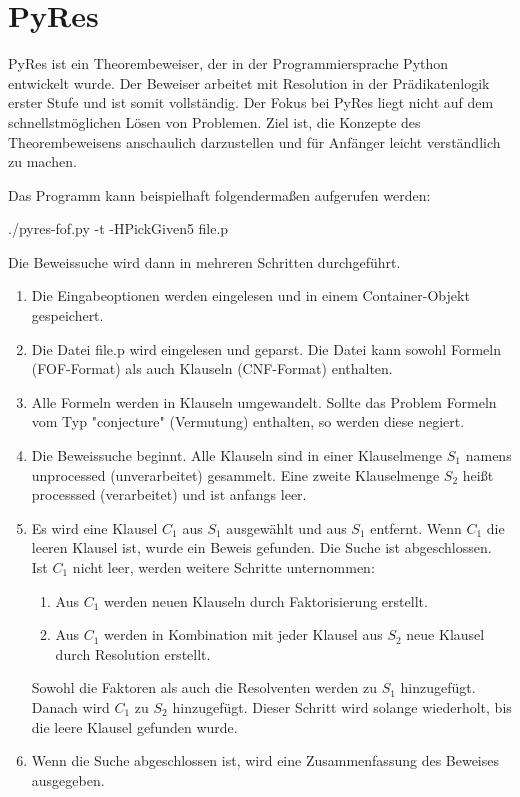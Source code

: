 	\section{PyRes}
PyRes ist ein Theorembeweiser, der in der Programmiersprache Python entwickelt wurde. Der Beweiser arbeitet mit Resolution in der Prädikatenlogik erster Stufe und ist somit vollständig. Der Fokus bei PyRes liegt nicht auf dem schnellstmöglichen Lösen von Problemen. Ziel ist, die Konzepte des Theorembeweisens anschaulich darzustellen und für Anfänger leicht verständlich zu machen. \cite{Schulz2020PyRes}

Das Programm kann beispielhaft folgendermaßen aufgerufen werden:

./pyres-fof.py -t -HPickGiven5 file.p

Die Beweissuche wird dann in mehreren Schritten durchgeführt. 
\begin{enumerate}
	\item Die Eingabeoptionen werden eingelesen und in einem Container-Objekt gespeichert.
	\item Die Datei file.p wird eingelesen und geparst. Die Datei kann sowohl Formeln (FOF-Format) als auch Klauseln (CNF-Format) enthalten.
	\item Alle Formeln werden in Klauseln umgewandelt. Sollte das Problem Formeln vom Typ "conjecture" (Vermutung) enthalten, so werden diese negiert.
	\item Die Beweissuche beginnt. Alle Klauseln sind in einer Klauselmenge $S_1$ namens unprocessed (unverarbeitet) gesammelt. Eine zweite Klauselmenge $S_2$ heißt processsed (verarbeitet) und ist anfangs leer. 
	\item Es wird eine Klausel $C_1$ aus $S_1$ ausgewählt und aus $S_1$ entfernt. Wenn $C_1$ die leeren Klausel ist, wurde ein Beweis gefunden. Die Suche ist abgeschlossen. Ist $C_1$ nicht leer, werden weitere Schritte unternommen:
	\begin{enumerate}
		\item Aus $C_1$ werden neuen Klauseln durch Faktorisierung erstellt.
		\item Aus $C_1$ werden in Kombination mit jeder Klausel aus $S_2$ neue Klausel durch Resolution erstellt.
	\end{enumerate}
	Sowohl die Faktoren als auch die Resolventen werden zu $S_1$ hinzugefügt. Danach wird $C_1$ zu $S_2$ hinzugefügt. Dieser Schritt wird solange wiederholt, bis die leere Klausel gefunden wurde.
	\item Wenn die Suche abgeschlossen ist, wird eine Zusammenfassung des Beweises ausgegeben.
\end{enumerate}
